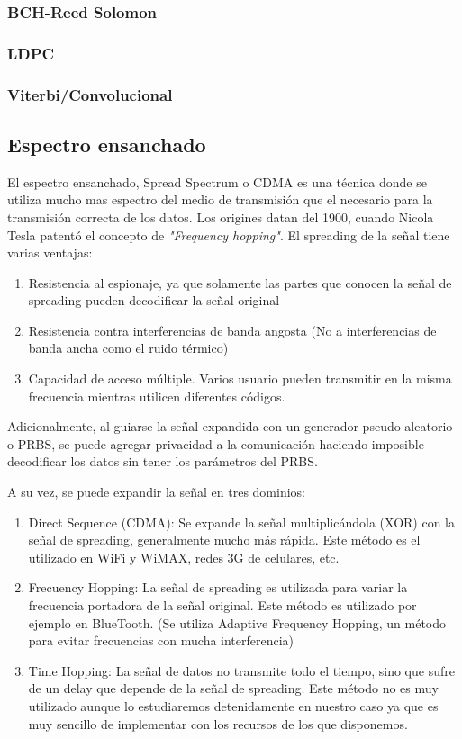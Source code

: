 \subsubsection{BCH-Reed Solomon}
\subsubsection{LDPC}
\subsubsection{Viterbi/Convolucional}

\subsection{Espectro ensanchado}
\label{espectroensanchado}
El espectro ensanchado, Spread Spectrum o CDMA es una técnica donde se utiliza mucho mas espectro del medio de transmisión que el necesario para la transmisión correcta de los datos.
Los origines datan del 1900, cuando Nicola Tesla patentó el concepto de \textit{"Frequency hopping"}.
El spreading de la señal tiene varias ventajas:
\begin{enumerate} 
\item Resistencia al espionaje, ya que solamente las partes que conocen la señal de spreading pueden decodificar la señal original
\item Resistencia contra interferencias de banda angosta (No a interferencias de banda ancha como el ruido térmico)
\item Capacidad de acceso múltiple. Varios usuario pueden transmitir en la misma frecuencia mientras utilicen diferentes códigos.
\end{enumerate} 
Adicionalmente, al guiarse la señal expandida con un generador pseudo-aleatorio o PRBS, se puede agregar privacidad a la comunicación haciendo imposible decodificar los datos sin tener los parámetros del PRBS.

A su vez, se puede expandir la señal en tres dominios:
\begin{enumerate} 
\item Direct Sequence (CDMA): Se expande la señal multiplicándola (XOR) con la señal de spreading, generalmente mucho más rápida. Este método es el utilizado en WiFi y WiMAX, redes 3G de celulares, etc.
\item Frecuency Hopping: La señal de spreading es utilizada para variar la frecuencia portadora de la señal original. Este método es utilizado por ejemplo en BlueTooth. (Se utiliza Adaptive Frequency Hopping, un método para evitar frecuencias con mucha interferencia)
\item Time Hopping: La señal de datos no transmite todo el tiempo, sino que sufre de un delay que depende de la señal de spreading. Este método no es muy utilizado aunque lo estudiaremos detenidamente en nuestro caso ya que es muy sencillo de implementar con los recursos de los que disponemos.
\end{enumerate} 


